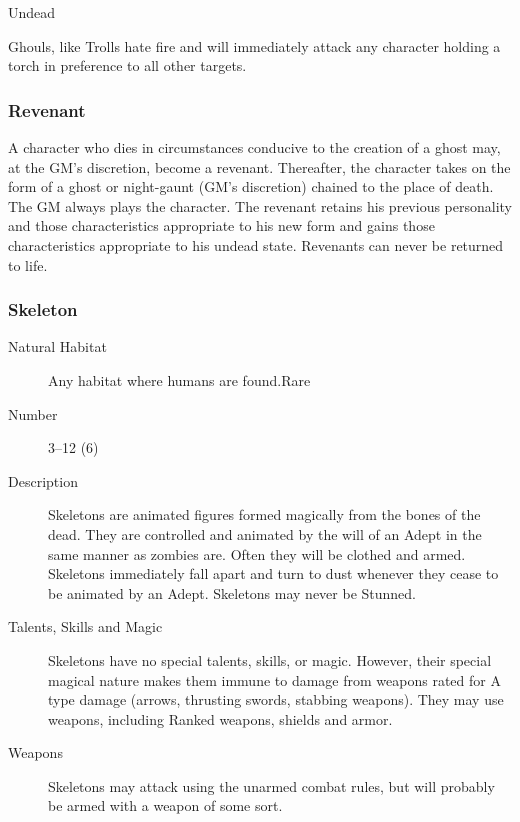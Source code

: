 \begin{mmgroup}{Undead}
\begin{mmcomment}
 Ghouls, like Trolls hate fire and will immediately attack
any character holding a torch in preference to all other targets.
\end{mmcomment}

\subsubsection{Revenant}

\begin{mmcomment}
 A character who dies in circumstances conducive to the
creation of a ghost may, at the GM's discretion, become a revenant.
Thereafter, the character takes on the form of a ghost or night-gaunt
(GM's discretion) chained to the place of death. The GM always plays
the character. The revenant retains his previous personality and those
characteristics appropriate to his new form and gains those
characteristics appropriate to his undead state.  Revenants can never
be returned to life.
\end{mmcomment}

\subsubsection{Skeleton}

\begin{description}
\item[Natural Habitat]Any habitat where humans are found.Rare

\item[Number]3–12 (6)

\item[Description] Skeletons are animated figures formed magically from the
bones of the dead. They are controlled and animated by the will of an
Adept in the same manner as zombies are.  Often they will be clothed
and armed. Skeletons immediately fall apart and turn to dust whenever
they cease to be animated by an Adept. Skeletons may never be Stunned.

\item[Talents, Skills and Magic] Skeletons have no special talents, skills, or magic.
However, their special magical nature makes them immune to damage from
weapons rated for A type damage (arrows, thrusting swords, stabbing
weapons). They may use weapons, including Ranked weapons, shields and
armor.

\item[Weapons] Skeletons may attack using the unarmed combat rules, but
will probably be armed with a weapon of some sort.


\end{description}
\end{mmgroup}
